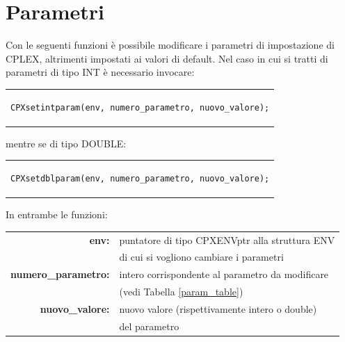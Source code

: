 \section{Parametri}\label{param}
Con le seguenti funzioni è possibile modificare i parametri di impostazione di CPLEX, altrimenti impostati ai valori di default.
Nel caso in cui si tratti di parametri di tipo INT è necessario invocare:\\
\begin{center}
\begin{tabular}{c}
\begin{lstlisting}[linewidth=330pt, basicstyle=\footnotesize\sffamily,]     
CPXsetintparam(env, numero_parametro, nuovo_valore);
\end{lstlisting}
\end{tabular}
\end{center}
mentre se di tipo DOUBLE:\\
\begin{center}
\begin{tabular}{c}
\begin{lstlisting}[linewidth=330pt, basicstyle=\footnotesize\sffamily,]     
CPXsetdblparam(env, numero_parametro, nuovo_valore);
\end{lstlisting}
\end{tabular}
\end{center}
In entrambe le funzioni:
\begin{table}[h]
\centering
\begin{tabular}{rl}
\textbf{env:} & {puntatore di tipo CPXENVptr alla struttura ENV}\\
& {di cui si vogliono cambiare i parametri}\\
\textbf{numero\_parametro:} & {intero corrispondente al parametro da modificare}\\
& {(vedi Tabella \ref{param_table})}\\
\textbf{nuovo\_valore:} & {nuovo valore (rispettivamente intero o double)}\\
& {del parametro}\\
\end{tabular}
\end{table}

